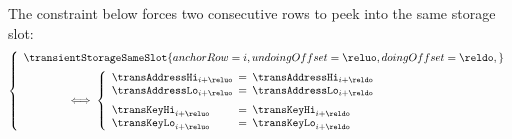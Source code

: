The constraint below forces two consecutive rows to peek into the same storage slot:
\[
	\left\{ \begin{array}{l}
		\transientStorageSameSlot {
			anchorRow     = i      ,
			undoingOffset = \reluo ,
			doingOffset   = \reldo ,
		}
		\vspace{2mm} \\
		\qquad\qquad
		\iff
		\left\{ \begin{array}{lcl}
			\transAddressHi _{i + \reluo} & \!\!\! = \!\!\! & \transAddressHi _{i + \reldo}              \\
			\transAddressLo _{i + \reluo} & \!\!\! = \!\!\! & \transAddressLo _{i + \reldo} \vspace{2mm} \\
			\transKeyHi     _{i + \reluo} & \!\!\! = \!\!\! & \transKeyHi     _{i + \reldo}              \\
			\transKeyLo     _{i + \reluo} & \!\!\! = \!\!\! & \transKeyLo     _{i + \reldo}              \\
		\end{array} \right.
	\end{array} \right.
\]

